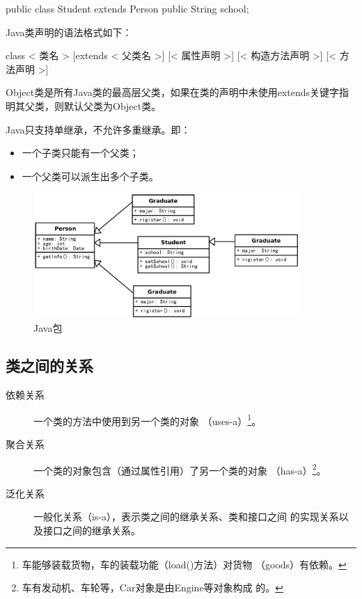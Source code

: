 
\begin{javaCode}
  public class Student extends Person {
    public String school;
  }
\end{javaCode}

Java类声明的语法格式如下：

\begin{javaCode}
  [< 修饰符 >] class < 类名 > [extends < 父类名 >] {
    [< 属性声明 >]
    [< 构造方法声明 >]
    [< 方法声明 >]
  }
\end{javaCode}

Object类是所有Java类的最高层父类，如果在类的声明中未使用extends关键字指明其父类，则默认父类为Object类。

Java只支持单继承，不允许多重继承。即：

\begin{itemize}
\item 一个子类只能有一个父类；
\item 一个父类可以派生出多个子类。
\end{itemize}

\begin{figure}[htb]
\centering
\includegraphics[width=0.9\textwidth]{images/Advanced-object-oriented-programming-1/fig-java-extends.pdf}
\caption{Java包}
\label{fig:java-package}
\end{figure}

\subsection{类之间的关系}

\begin{description}
\item[依赖关系] 一个类的方法中使用到另一个类的对象
  （uses-a）\footnote{车能够装载货物，车的装载功能（load()方法）对货物
    （goods）有依赖。}。
\item[聚合关系] 一个类的对象包含（通过属性引用）了另一个类的对象
  （has-a）\footnote{车有发动机、车轮等，Car对象是由Engine等对象构成
    的。}。
\item[泛化关系] 一般化关系（is-a），表示类之间的继承关系、类和接口之间
  的实现关系以及接口之间的继承关系。
\end{description}

